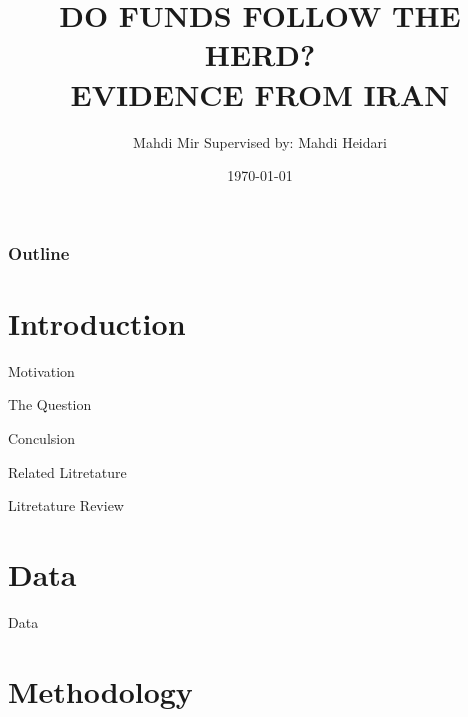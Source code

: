 \documentclass{beamer}
\title[]{\MakeUppercase{Do Funds Follow the Herd? \\ Evidence from Iran}}
\subtitle{}
\author[]{Mahdi Mir \newline Supervised by: Mahdi Heidari}
\institute[TeIAS]{Tehran Institute for Advanced Studies}
\date[TeIAS]{\today}
\begin{document}

\begin{frame}
    \titlepage{}
\end{frame}


\begin{frame}[label=toc]
    \frametitle{Outline}
    \tableofcontents{}
\end{frame}



\section{Introduction}



\begin{frame}{Motivation}


\end{frame}


\begin{frame}{The Question}

\end{frame}


\begin{frame}{Conculsion}


\end{frame}



\begin{frame}{Related Litretature}



\end{frame}


\begin{frame}{Litretature Review}



\end{frame}



\section{Data}



\begin{frame}{Data}



\end{frame}



\section{Methodology}
\end{document}
